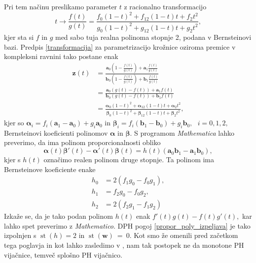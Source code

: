 \documentclass[12pt,a4paper,twoside]{article}
\theoremstyle{definition} %
\theoremstyle{plain} %
\theoremstyle{primerstyle}
\numberwithin{equation}{section}  %
\newcommand{\aV}{\mathbf{a}}
\newcommand{\bV}{\mathbf{b}}
\newcommand{\wV}{\mathbf{w}}
\newcommand{\zV}{\mathbf{z}}
\newcommand{\balpha}{\boldsymbol \alpha}
\newcommand{\bbeta}{\boldsymbol \beta}
\DeclareMathOperator{\st}{st}
\begin{document}
Pri tem načinu preslikamo parameter $t$ z racionalno transformacijo
\begin{equation}
	\label{kvadraticna_reparametrizacija}
	t\to\frac{f(t)}{g(t)}=\frac{f_0(1-t)^2+f_12(1-t)t+f_2t^2}{g_0(1-t)^2+g_12(1-t)t+g_2t^2},
\end{equation}
kjer sta si $f$ in $g$ med sabo tuja realna polinoma stopnje 2, podana v Bernsteinovi bazi. Predpis \eqref{transformacija} za parametrizacijo krožnice oziroma premice v kompleksni ravnini tako postane enak
\begin{align*}
	\zV(t)&=\frac{\aV_0\left(1-\frac{f(t)}{g(t)}\right)+\aV_1\frac{f(t)}{g(t)}}{\bV_0\left(1-\frac{f(t)}{g(t)}\right)+\bV_1\frac{f(t)}{g(t)}}\\
	&=\frac{\aV_0(g(t)-f(t))+\aV_1f(t)}{\bV_0(g(t)-f(t))+\bV_1f(t)}\\
	&=\frac{\balpha_0(1-t)^2+\balpha_12(1-t)t+\balpha_2t^2}{\bbeta_0(1-t)^2+\bbeta_12(1-t)t+\bbeta_2t^2},
\end{align*}
kjer so $\balpha_i=f_i(\aV_1-\aV_0)+g_i\aV_0$ in $\bbeta_i=f_i(\bV_1-\bV_0)+g_i\bV_0,\text{ }i=0,1,2,$ Bernsteinovi koeficienti polinomov $\balpha$ in $\bbeta.$ S programom \emph{Mathematica} lahko preverimo, da ima polinom proporcionalnosti obliko
\begin{equation*}
	\balpha(t)\bbeta'(t)-\balpha'(t)\bbeta(t)=h(t)(\aV_0\bV_1-\aV_1\bV_0),
\end{equation*}
kjer s $h(t)$ označimo realen polinom druge stopnje. Ta polinom ima Bernsteinove koeficiente enake
\begin{align}
	h_0&=2(f_1g_0-f_0g_1),\nonumber\\
	h_1&=f_2g_0-f_0g_2,\label{polinom_h_kvadra_repara}\\
	h_2&=2(f_2g_1-f_1g_2)\nonumber
\end{align}
Izkaže se, da je tako podan polinom $h(t)$ enak $f'(t)g(t)-f(t)g'(t),$ kar lahko spet preverimo z \emph{Mathematico}. DPH pogoj \eqref{propor_poly_izpeljava} je tako izpolnjen s $\st(h)=2$ in $\st(\wV)~=~0.$ Kot smo že omenili pred začetkom tega poglavja in kot lahko zasledimo v \cite[str.\ 118]{beltranmonterde}, nam tak postopek ne da monotone PH vijačnice, temveč splošno PH vijačnico.
\end{document}
